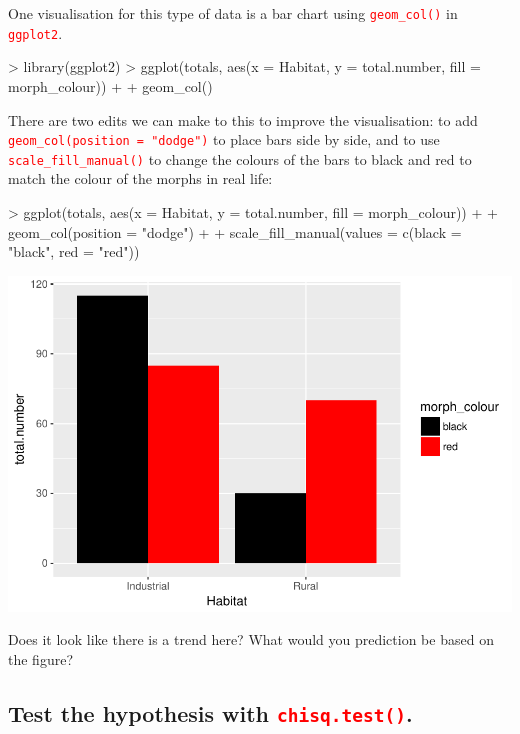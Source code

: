 \documentclass[a4paper,12pt]{article}
\newcommand\code[1]{\textcolor{red}{\texttt{#1}}}
\begin{document}
One visualisation for this type of data is a bar chart using \code{geom\_col()} in \code{ggplot2}.


\begin{shaded}
\begin{Schunk}
\begin{Sinput}
> library(ggplot2)
> ggplot(totals, aes(x = Habitat, y = total.number, fill = morph_colour)) +
+   geom_col() 
\end{Sinput}
\end{Schunk}
\end{shaded}

There are two edits we can make to this to improve the visualisation: to add \code{geom\_col(position = "dodge")} to place bars side by side, and to use \code{scale\_fill\_manual()} to change the colours of the bars to black and red to match the colour of the morphs in real life:


\begin{shaded}
\begin{Schunk}
\begin{Sinput}
> ggplot(totals, aes(x = Habitat, y = total.number, fill = morph_colour)) +
+   geom_col(position = "dodge") +
+   scale_fill_manual(values = c(black = "black", red = "red"))
\end{Sinput}
\end{Schunk}
\includegraphics{1_Stats_Course_Notes-knitr-008}
\end{shaded}

Does it look like there is a trend here? What would you prediction be based on the figure?

\subsection{Test the hypothesis with \code{chisq.test()}.}
\end{document}
